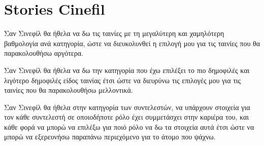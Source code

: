 \section{Stories Cinefil}

\begin{tcolorbox}[colback=fg!10!white,colframe=cbg!100!white,
	title=1η ιστορία]
Σαν Σινεφίλ θα ήθελα να δω τις ταινίες με τη μεγαλύτερη και χαμηλότερη βαθμολογία ανά κατηγορία, ώστε να διευκολυνθεί η επιλογή μου για τις ταινίες που θα παρακολουθήσω αργότερα.
\end{tcolorbox}

\begin{tcolorbox}[colback=fg!10!white,colframe=cbg!100!white,
	title=2η ιστορία]
Σαν Σινεφίλ θα ήθελα να δω την κατηγορία που έχω επιλέξει το πιο δημοφιλές και λιγότερο δημοφιλές είδος ταινίας έτσι ώστε να διευρύνω τις επιλογές μου για τις ταινίες που θα παρακολουθήσω μελλοντικά.
\end{tcolorbox}

\begin{tcolorbox}[colback=fg!10!white,colframe=cbg!100!white,
	title=3η ιστορία]
Σαν Σινεφίλ θα ήθελα στην κατηγορία των συντελεστών, να υπάρχουν στοιχεία για τον κάθε συντελεστή σε οποιοδήποτε ρόλο έχει συμμετάσχει στην καριέρα του, και κάθε φορά να μπορώ να επιλέξω για ποιό ρόλο να δω τα στοιχεία αυτά έτσι ώστε να μπορώ να εξερευνήσω παραπάνω περιεχόμενο για το άτομο που ψάχνω.
\end{tcolorbox}